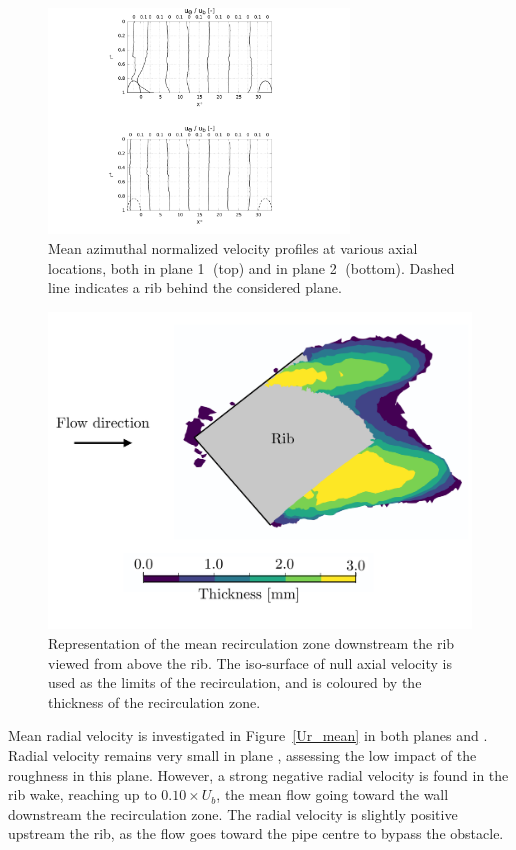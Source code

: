 \begin{figure}[h!]
\centering
\includegraphics[width=8cm]{fig/applications/optim/Azimuthal_vel.pdf}
\caption{Mean azimuthal normalized velocity profiles at various axial locations, both in plane \textcircled{1} (top) and in plane \textcircled{2} (bottom). Dashed line indicates a rib behind the considered plane.}
\label{Uw_mean}
\end{figure}

\begin{figure}[h]
\centering
\includegraphics[width=\linewidth]{fig/applications/optim/Recircul.pdf}
\caption{Representation of the mean recirculation zone downstream the rib viewed from above the rib. The iso-surface of null axial velocity is used as the limits of the recirculation, and is coloured by the thickness of the recirculation zone.}
\label{recircul}
\end{figure}

Mean radial velocity is investigated in Figure~\ref{Ur_mean} in both planes  and . Radial velocity remains very small in plane , assessing the low impact of the roughness in this plane. However, a strong negative radial velocity is found in the rib wake, reaching up to $0.10 \times U_b$, the mean flow going toward the wall downstream the recirculation zone. The radial velocity is slightly positive upstream the rib, as the flow goes toward the pipe centre to bypass the obstacle.\\

